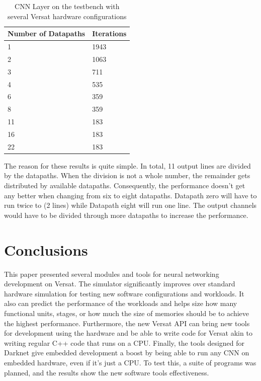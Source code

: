 \documentclass[conference]{IEEEtran}
\begin{document}
\begin{table}[!htpb]
    \centering
    \begin{tabular}{ll}
    \hline
    \textbf{Number of Datapaths} &  \textbf{Iterations}        \\ \hline
    1          & 1943                 \\
	2          & 1063                 \\
	3          & 711                 \\
	4          & 535                 \\
	6          & 359                 \\
	8          & 359                 \\
	11          & 183                 \\
	16          & 183                 \\
    22            & 183                       \\  \hline
    \end{tabular}
    \label{table:Iterations}
    \linebreak
    \caption{CNN Layer on the testbench with several Versat hardware configurations}
\end{table}

The reason for these results is quite simple. In total, 11 output lines are divided
by the datapaths. When the division is not a whole number, the remainder gets distributed
by available datapaths. Consequently, the performance
doesn't get any better when changing from six to eight datapaths. Datapath zero will have to run twice to (2 lines) while Datapath eight will run one line.
The output channels would have to be divided through more datapaths to increase the performance.





\section{Conclusions}
\label{chapter:conclusions}

This paper presented several modules and tools for neural networking development on Versat.
The simulator significantly improves over standard hardware simulation for testing new
software configurations and workloads. It also can predict the performance of the workloads
and helps size how many functional units, stages, or how much the size of memories should be
to achieve the highest performance.
Furthermore, the new Versat API can bring new tools for development using the hardware
and be able to write code for Versat akin to writing regular C++ code that runs on a CPU.
Finally, the tools designed for Darknet give embedded development a boost by being able to
run any CNN on embedded hardware, even if it's just a CPU.
To test this, a suite of programs was planned, and the results show the new software tools
effectiveness.
\end{document}
